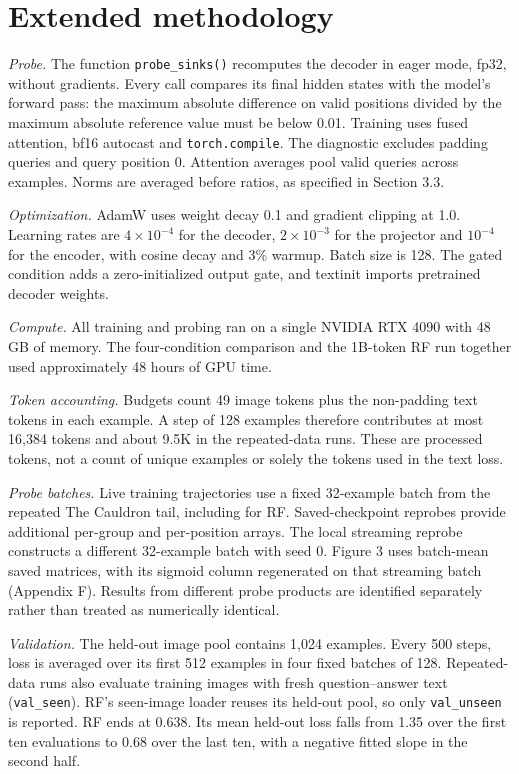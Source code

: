 \documentclass{article}
\begin{document}
\newpage
\appendix

\FloatBarrier
\section{Extended methodology}

\textit{Probe.} The function \texttt{probe\_sinks()} recomputes the decoder in eager mode, fp32, without gradients. Every call compares its final hidden states with the model's forward pass: the maximum absolute difference on valid positions divided by the maximum absolute reference value must be below 0.01. Training uses fused attention, bf16 autocast and \texttt{torch.compile}. The diagnostic excludes padding queries and query position 0. Attention averages pool valid queries across examples. Norms are averaged before ratios, as specified in Section 3.3.

\textit{Optimization.} AdamW uses weight decay 0.1 and gradient clipping at 1.0. Learning rates are $4\times10^{-4}$ for the decoder, $2\times10^{-3}$ for the projector and $10^{-4}$ for the encoder, with cosine decay and 3\% warmup. Batch size is 128. The gated condition adds a zero-initialized output gate, and textinit imports pretrained decoder weights.

\textit{Compute.} All training and probing ran on a single NVIDIA RTX 4090 with 48 GB of memory. The four-condition comparison and the 1B-token RF run together used approximately 48 hours of GPU time.

\textit{Token accounting.} Budgets count 49 image tokens plus the non-padding text tokens in each example. A step of 128 examples therefore contributes at most 16,384 tokens and about 9.5K in the repeated-data runs. These are processed tokens, not a count of unique examples or solely the tokens used in the text loss.

\textit{Probe batches.} Live training trajectories use a fixed 32-example batch from the repeated The Cauldron tail, including for RF. Saved-checkpoint reprobes provide additional per-group and per-position arrays. The local streaming reprobe constructs a different 32-example batch with seed 0. Figure 3 uses batch-mean saved matrices, with its sigmoid column regenerated on that streaming batch (Appendix F). Results from different probe products are identified separately rather than treated as numerically identical.

\textit{Validation.} The held-out image pool contains 1,024 examples. Every 500 steps, loss is averaged over its first 512 examples in four fixed batches of 128. Repeated-data runs also evaluate training images with fresh question--answer text (\texttt{val\_seen}). RF's seen-image loader reuses its held-out pool, so only \texttt{val\_unseen} is reported. RF ends at 0.638. Its mean held-out loss falls from 1.35 over the first ten evaluations to 0.68 over the last ten, with a negative fitted slope in the second half.
\end{document}
